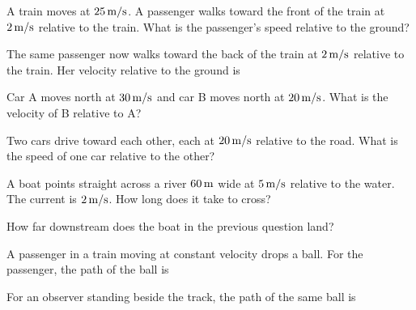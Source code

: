 \begin{exo}{}
A train moves at $25\ms$. A passenger walks toward the front of the train at $2\ms$ relative to the train. What is the passenger's speed relative to the ground?
\choices{$23\ms$}{$27\ms$}{$25\ms$}{$2\ms$}
\end{exo}
\begin{exo}{}
The same passenger now walks toward the back of the train at $2\ms$ relative to the train. Her velocity relative to the ground is
\end{exo}
\begin{exo}{}
Car A moves north at $30\,\mathrm{m/s}$ and car B moves north at $20\,\mathrm{m/s}$. What is the velocity of B relative to A?
\end{exo}
\begin{exo}{}
Two cars drive toward each other, each at $20\,\mathrm{m/s}$ relative to the road. What is the speed of one car relative to the other?
\end{exo}
\begin{exo}{}
A boat points straight across a river $60\m$ wide at $5\,\mathrm{m/s}$ relative to the water. The current is $2\ms$. How long does it take to cross?
\choices{$12\s$}{$30\s$}{$8.6\s$}{$11.1\s$}
\end{exo}
\begin{exo}{}
How far downstream does the boat in the previous question land?
\choices{$12\m$}{$24\m$}{$60\m$}{$30\m$}
\end{exo}
\begin{exo}{}
A passenger in a train moving at constant velocity drops a ball. For the passenger, the path of the ball is
\end{exo}
\begin{exo}{}
For an observer standing beside the track, the path of the same ball is
\end{exo}
